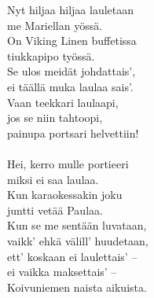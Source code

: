 
Nyt hiljaa hiljaa lauletaan \\ me Mariellan yössä. \\ On Viking Linen buffetissa \\ tiukkapipo työssä. \\ Se ulos meidät johdattais', \\ ei täällä muka laulaa sais'. \\ Vaan teekkari laulaapi, \\ jos se niin tahtoopi, \\ painupa portsari helvettiin! \\ \hspace{10mm} \\ Hei, kerro mulle portieeri \\ miksi ei saa laulaa. \\ Kun karaokessakin joku \\ juntti vetää Paulaa. \\ Kun se me sentään luvataan, \\ vaikk' ehkä välill' huudetaan, \\ ett' koskaan ei laulettais' -- \\ ei vaikka maksettais' -- \\ Koivuniemen naista aikuista.